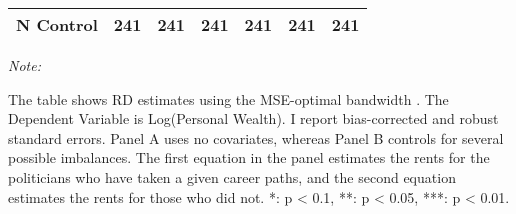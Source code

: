 \begin{table}[!h]
\begin{threeparttable}
\begin{tabular}[t]{lllllll}
\hspace{1em}N Control & 241 & 241 & 241 & 241 & 241 & 241\\
\bottomrule
\end{tabular}
\begin{tablenotes}[para]
\item \textit{Note: } 
\item The table shows RD estimates using the MSE-optimal bandwidth \citep{cattaneo2019practical}. The Dependent Variable is Log(Personal Wealth). I report bias-corrected and robust standard errors. Panel A uses no covariates, whereas Panel B controls for several possible imbalances. The first equation in the panel estimates the rents for the politicians who have taken a given career paths, and the second equation estimates the rents for those who did not. *: p < 0.1, **: p < 0.05, ***: p < 0.01.
\end{tablenotes}
\end{threeparttable}
\end{table}
